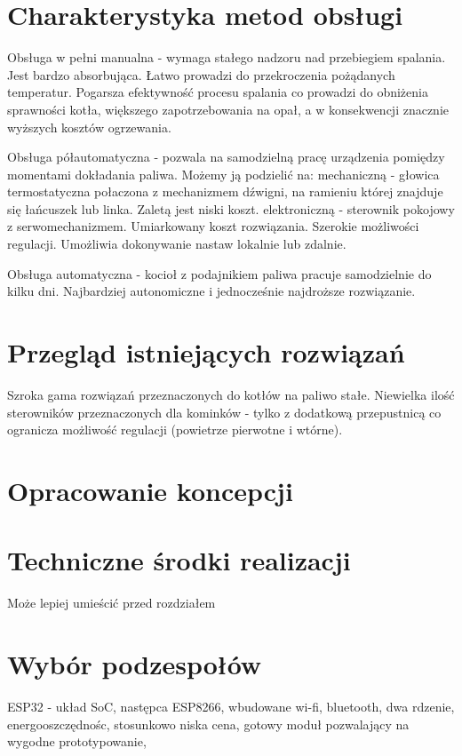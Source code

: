 \documentclass[12pt]{report}
\begin{document}
 \chapter{Charakterystyka metod obsługi} 
 Obsługa w pełni manualna - wymaga stałego nadzoru nad przebiegiem spalania. Jest bardzo absorbująca. Łatwo prowadzi do przekroczenia pożądanych temperatur. Pogarsza efektywność procesu spalania co prowadzi do obniżenia sprawności kotła, większego zapotrzebowania na opał, a w konsekwencji znacznie wyższych kosztów ogrzewania.
 
 Obsługa półautomatyczna - pozwala na samodzielną pracę urządzenia pomiędzy momentami dokładania paliwa. Możemy ją podzielić na:
 mechaniczną - głowica termostatyczna połaczona z mechanizmem dźwigni, na ramieniu której znajduje się łańcuszek lub linka. Zaletą jest niski koszt.
 elektroniczną - sterownik pokojowy z serwomechanizmem. Umiarkowany koszt rozwiązania. Szerokie możliwości regulacji. Umożliwia dokonywanie nastaw lokalnie lub zdalnie.
 
 Obsługa automatyczna - kocioł z podajnikiem paliwa pracuje samodzielnie do kilku dni. Najbardziej autonomiczne i jednocześnie najdroższe rozwiązanie.
 
 
 \chapter{Przegląd istniejących rozwiązań}
 Szroka gama rozwiązań przeznaczonych do kotłów na paliwo stałe.
 Niewielka ilość sterowników przeznaczonych dla kominków - tylko z dodatkową przepustnicą co ogranicza możliwość regulacji (powietrze pierwotne i wtórne).
  
 \chapter{Opracowanie koncepcji}
 
 \chapter{Techniczne środki realizacji}
 Może lepiej umieścić przed rozdziałem \label{rozdz.stworzenie}
 
 \chapter{Wybór podzespołów}
 ESP32 - układ SoC, następca ESP8266, wbudowane wi-fi, bluetooth, dwa rdzenie, energooszczędnośc, stosunkowo niska cena, gotowy moduł pozwalający na wygodne prototypowanie, 
 
\end{document}
